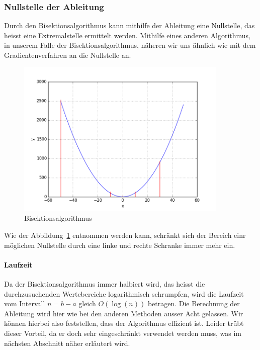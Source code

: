 \documentclass[10pt]{article}         %
\begin{document}
\subsubsection{Nullstelle der Ableitung}
Durch den Bisektionsalgorithmus kann mithilfe der Ableitung eine Nullstelle, das heisst eine Extremalstelle ermittelt werden. Mithilfe eines anderen Algorithmus, in unserem Falle der Bisektionsalgorithmus, näheren wir uns ähnlich wie mit dem Gradientenverfahren an die Nullstelle an. 

\begin{figure}[!ht]
    \centering
    \includegraphics[width=0.9\textwidth]{bisektion}
    \caption{Bisektionsalgorithmus}\label{bisektion}
\end{figure}

Wie der Abbildung~\ref{bisektion} entnommen werden kann, schränkt sich der Bereich einr möglichen Nullstelle durch eine linke und rechte Schranke immer mehr ein.

\paragraph{Laufzeit}
Da der Bisektionsalgorithmus immer halbiert wird, das heisst die durchzusuchenden Wertebereiche logarithmisch schrumpfen, wird die Laufzeit vom Intervall $n=b-a$ gleich $O(\log(n))$ betragen. Die Berechnung der Ableitung wird hier wie bei den anderen Methoden ausser Acht gelassen. Wir können hierbei also feststellen, dass der Algorithmus effizient ist. Leider trübt dieser Vorteil, da er doch sehr eingeschränkt verwendet werden muss, was im nächsten Abschnitt näher erläutert wird.
\end{document}
